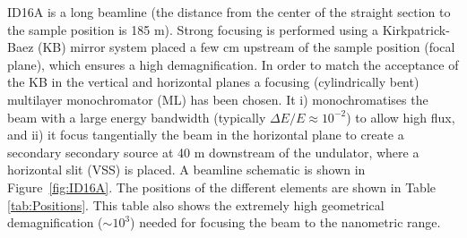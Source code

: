 \documentclass{iucr}              %
\begin{document}


\begin{table}\label{tab:Undulators}
\centering
\caption{Parameters of the undulators available at the ID16A beamline: period ($\lambda_u$), length ($L$), number of identical undulators ($N$) and deflection parameter ($K$) values for the three main photon energies in use. The valuse are shown for the two ESRF magnetic lattices: the old ESRF-1 (labelled ESRF, with $E_e = 6.04$ GeV) and the new ESRF-EBS (labelled EBS, with $E_e = 6.00$ GeV). $n$ is the emission harmonic in use for each particular photon energy.}

\end{table}

ID16A is a long beamline (the distance from the center of the straight section to the sample position is 185 m). Strong focusing is performed using a Kirkpatrick-Baez (KB) mirror system placed a few cm upstream of the sample position (focal plane), which ensures a high demagnification. In order to match the acceptance of the KB in the vertical and horizontal planes a focusing (cylindrically bent) multilayer monochromator (ML) has
been chosen. It i) monochromatises the beam with a large energy bandwidth (typically $\Delta E/E \approx 10^{-2}$) to allow high flux, 
and ii) it focus tangentially the beam  in the horizontal plane to create a secondary secondary source at 40 m downstream of the undulator, where a horizontal slit (VSS) is placed. A beamline schematic is shown in Figure~\ref{fig:ID16A}. The positions of the different elements are shown in Table \ref{tab:Positions}. This table also shows the extremely high geometrical demagnification ($\sim 10^3$) needed for focusing the beam to the nanometric range.  
\end{document}
